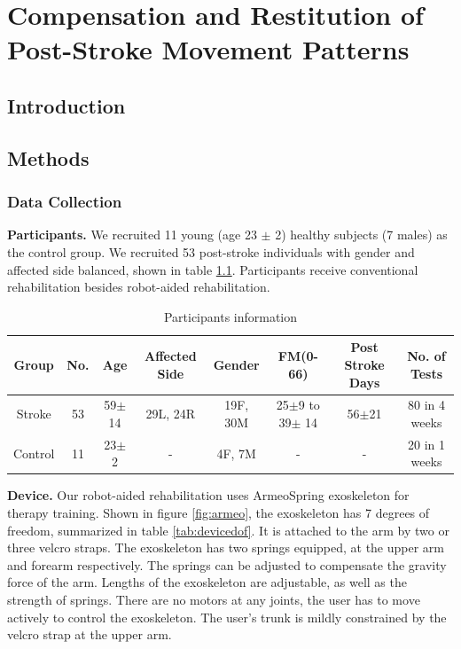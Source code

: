 \chapter{Compensation and Restitution of Post-Stroke Movement Patterns}
\label{cha:armeospring}



\section{Introduction}



\section{Methods}

\subsection{Data Collection}

\textbf{Participants.} 
We recruited 11 young (age 23 $\pm$ 2) healthy subjects (7 males) as the control group.
We recruited 53 post-stroke individuals with gender and affected side balanced, shown in table \ref{tab:demog}. 
Participants receive conventional rehabilitation besides robot-aided rehabilitation.

\begin{table}[b]
	\begin{tabular}{c c c c c c c c}
		\hline
		Group & No. & Age & Affected Side & Gender & FM(0-66) & Post Stroke Days & No. of Tests\\
		\hline
		Stroke & 53 & 59$\pm$14 & 29L, 24R & 19F, 30M & 25$\pm$9 to 39$\pm$ 14 & 56$\pm$21 & 80 in 4 weeks \\ 
		Control & 11 & 23$\pm$2 & - & 4F, 7M & - & - & 20 in 1 weeks \\
		\hline
	\end{tabular}
	\caption{Participants information}
	\label{tab:demog}
\end{table}

\textbf{Device.}
Our robot-aided rehabilitation uses ArmeoSpring exoskeleton \cite{} for therapy training. 
Shown in figure \ref{fig:armeo}, the exoskeleton has 7 degrees of freedom, summarized in table \ref{tab:devicedof}. 
It is attached to the arm by two or three velcro straps. 
The exoskeleton has two springs equipped, at the upper arm and forearm respectively. 
The springs can be adjusted to compensate the gravity force of the arm. 
Lengths of the exoskeleton are adjustable, as well as the strength of springs. 
There are no motors at any joints, the user has to move actively to control the exoskeleton. 
The user's trunk is mildly constrained by the velcro strap at the upper arm.  

